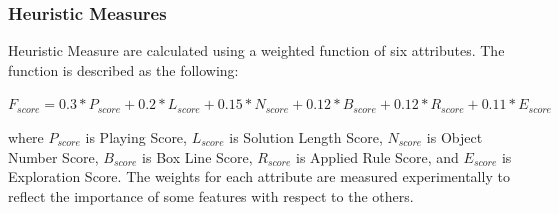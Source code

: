 \subsubsection{Heuristic Measures}
Heuristic Measure are calculated using a weighted function of six attributes. The function is described as the following:
\begin{center}$F_{score} = 0.3 * P_{score} + 0.2 * L_{score} + 0.15 * N_{score} + 0.12 * B_{score} + 0.12 * R_{score} + 0.11 * E_{score}$\end{center}
where $P_{score}$ is Playing Score, $L_{score}$ is Solution Length Score, $N_{score}$ is Object Number Score, $B_{score}$ is Box Line Score, $R_{score}$ is Applied Rule Score, and $E_{score}$ is Exploration Score. The weights for each attribute are measured experimentally to reflect the importance of some features with respect to the others.
